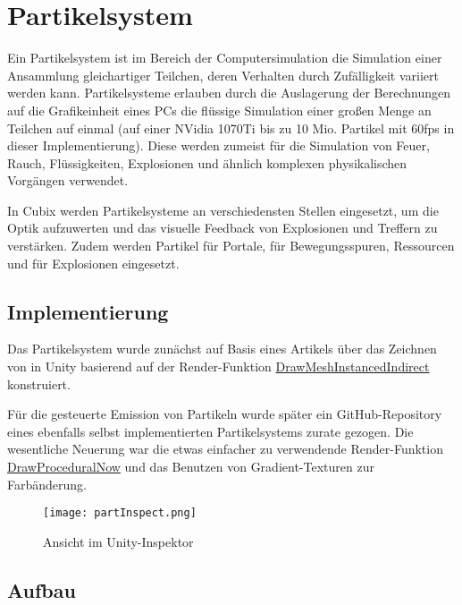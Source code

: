 \section{Partikelsystem}

Ein Partikelsystem ist im Bereich der Computersimulation die Simulation einer Ansammlung gleichartiger Teilchen, deren Verhalten durch Zufälligkeit variiert werden kann. Partikelsysteme erlauben durch die Auslagerung der Berechnungen auf die Grafikeinheit eines PCs die flüssige Simulation einer gro{\ss}en Menge an Teilchen auf einmal (auf einer NVidia 1070Ti bis zu 10 Mio. Partikel mit 60fps in dieser Implementierung). Diese werden zumeist für die Simulation von Feuer, Rauch, Flüssigkeiten, Explosionen und ähnlich komplexen physikalischen Vorgängen verwendet.

In Cubix werden Partikelsysteme an verschiedensten Stellen eingesetzt, um die Optik aufzuwerten und das visuelle Feedback von Explosionen und Treffern zu verstärken. Zudem werden Partikel für Portale, für Bewegungsspuren, Ressourcen und für Explosionen eingesetzt.



\subsection{Implementierung}

Das Partikelsystem wurde zunächst auf Basis eines Artikels über das Zeichnen von \cite{qPartS1} in Unity basierend auf der Render-Funktion \href{https://docs.unity3d.com/ScriptReference/Graphics.DrawMeshInstancedIndirect.html}{DrawMeshInstancedIndirect} konstruiert.

Für die gesteuerte Emission von Partikeln wurde später ein GitHub-Repository eines ebenfalls selbst implementierten Partikelsystems\cite{qPartS2} zurate gezogen. Die wesentliche Neuerung war die etwas einfacher zu verwendende Render-Funktion \href{https://docs.unity3d.com/ScriptReference/Graphics.DrawProceduralNow.html}{DrawProceduralNow} und das Benutzen von Gradient-Texturen zur Farbänderung.

\begin{figure}[H]
\centering
\texttt{[image: partInspect.png]}
\caption{Ansicht im Unity-Inspektor}
\label{img:partInspect}
\end{figure}


\subsection{Aufbau}

